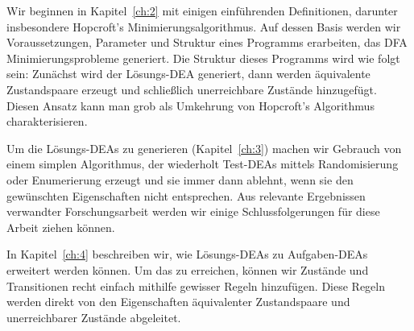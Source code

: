 Wir beginnen in Kapitel~\ref{ch:2} mit einigen einführenden Definitionen, darunter insbesondere Hopcroft's Minimierungsalgorithmus. Auf dessen Basis werden wir Voraussetzungen, Parameter und Struktur eines Programms erarbeiten, das DFA Minimierungsprobleme generiert. Die Struktur dieses Programms wird wie folgt sein: Zunächst wird der Lösungs-DEA generiert, dann werden äquivalente Zustandspaare erzeugt und schließlich unerreichbare Zustände hinzugefügt. Diesen Ansatz kann man grob als Umkehrung von Hopcroft's Algorithmus charakterisieren.

Um die Lösungs-DEAs zu generieren (Kapitel~\ref{ch:3}) machen wir Gebrauch von einem simplen Algorithmus, der wiederholt Test-DEAs mittels Randomisierung oder Enumerierung erzeugt und sie immer dann ablehnt, wenn sie den gewünschten Eigenschaften nicht entsprechen. Aus relevante Ergebnissen verwandter Forschungsarbeit werden wir einige Schlussfolgerungen für diese Arbeit ziehen können.

In Kapitel~\ref{ch:4} beschreiben wir, wie Lösungs-DEAs zu Aufgaben-DEAs erweitert werden können. Um das zu erreichen, können wir Zustände und Transitionen recht einfach mithilfe gewisser Regeln hinzufügen. Diese Regeln werden direkt von den Eigenschaften äquivalenter Zustandspaare und unerreichbarer Zustände abgeleitet.
	